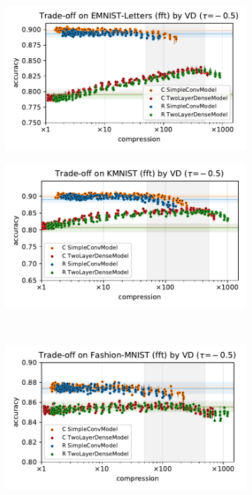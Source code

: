 \documentclass[a4paper,10pt,twocolumn]{article}
\begin{document}
\begin{figure}[b]
  \centering
  \begin{subfigure}[b]{0.5\columnwidth}
    \centering
    \includegraphics[width=\linewidth]{figure__mnist-like__trade-off/appendix__VD__emnist_letters__fft__-0.5.pdf}
  \end{subfigure}%
  \begin{subfigure}[b]{0.5\columnwidth}
    \centering
    \includegraphics[width=\linewidth]{figure__mnist-like__trade-off/appendix__VD__kmnist__fft__-0.5.pdf}
  \end{subfigure} \\ %
  \begin{subfigure}[b]{0.5\columnwidth}
    \centering
    \includegraphics[width=\linewidth]{figure__mnist-like__trade-off/appendix__VD__fashionmnist__fft__-0.5.pdf}

\end{subfigure}
\end{figure}
\end{document}
